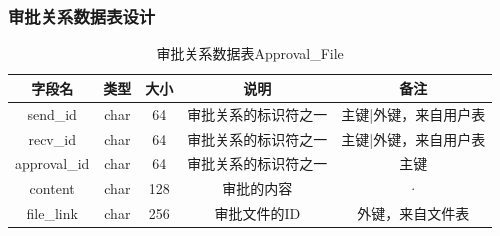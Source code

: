 {\subsubsection{审批关系数据表设计}
\begin{table}[htbp]
\centering
{\color{red}
\caption{\color{red}审批关系数据表Approval\_File} \label{tab:order-database}
\begin{tabular}{|c|c|c|c|c|}
    \hline
    字段名 & 类型 & 大小 & 说明 & 备注 \\
    \hline
    send\_id & char & 64 & 审批关系的标识符之一 & 主键|外键，来自用户表 \\
    \hline
    recv\_id & char & 64 & 审批关系的标识符之一 & 主键|外键，来自用户表 \\
    \hline
    approval\_id & char & 64 & 审批关系的标识符之一 & 主键 \\
    \hline
    content & char & 128 & 审批的内容 & · \\ 
    \hline
    file\_link & char & 256 & 审批文件的ID & 外键，来自文件表 \\
    \hline
\end{tabular}
}
\end{table}


}






